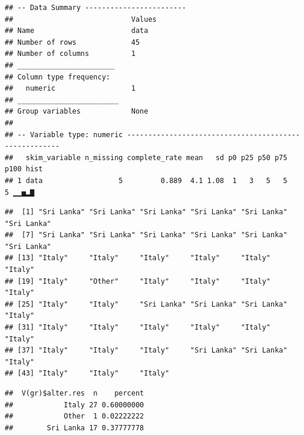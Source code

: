 \documentclass[
]{book}
\newenvironment{Shaded}{\begin{snugshade}}{\end{snugshade}}
\newcommand{\CommentTok}[1]{\textcolor[rgb]{0.56,0.35,0.01}{\textit{#1}}}
\newcommand{\FunctionTok}[1]{\textcolor[rgb]{0.13,0.29,0.53}{\textbf{#1}}}
\newcommand{\NormalTok}[1]{#1}
\newcommand{\SpecialCharTok}[1]{\textcolor[rgb]{0.81,0.36,0.00}{\textbf{#1}}}
\begin{document}
\begin{verbatim}
## -- Data Summary ------------------------
##                            Values
## Name                       data  
## Number of rows             45    
## Number of columns          1     
## _______________________          
## Column type frequency:           
##   numeric                  1     
## ________________________         
## Group variables            None  
## 
## -- Variable type: numeric ------------------------------------------------------
##   skim_variable n_missing complete_rate mean   sd p0 p25 p50 p75 p100 hist 
## 1 data                  5         0.889  4.1 1.08  1   3   5   5    5 ▁▁▅▂▇
\end{verbatim}

\begin{Shaded}
\end{Shaded}

\begin{verbatim}
##  [1] "Sri Lanka" "Sri Lanka" "Sri Lanka" "Sri Lanka" "Sri Lanka" "Sri Lanka"
##  [7] "Sri Lanka" "Sri Lanka" "Sri Lanka" "Sri Lanka" "Sri Lanka" "Sri Lanka"
## [13] "Italy"     "Italy"     "Italy"     "Italy"     "Italy"     "Italy"    
## [19] "Italy"     "Other"     "Italy"     "Italy"     "Italy"     "Italy"    
## [25] "Italy"     "Italy"     "Sri Lanka" "Sri Lanka" "Sri Lanka" "Italy"    
## [31] "Italy"     "Italy"     "Italy"     "Italy"     "Italy"     "Italy"    
## [37] "Italy"     "Italy"     "Italy"     "Sri Lanka" "Sri Lanka" "Italy"    
## [43] "Italy"     "Italy"     "Italy"
\end{verbatim}

\begin{Shaded}
\end{Shaded}

\begin{verbatim}
##  V(gr)$alter.res  n    percent
##            Italy 27 0.60000000
##            Other  1 0.02222222
##        Sri Lanka 17 0.37777778
\end{verbatim}
\end{document}
